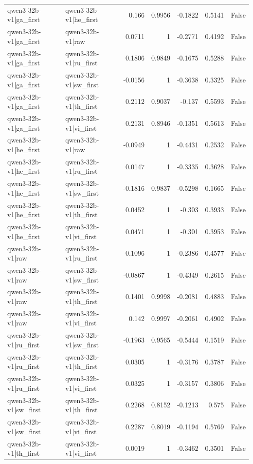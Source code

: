 \begin{table}
\begin{tabular}{l l r r r r l}
qwen3-32b-v1|ga_first & qwen3-32b-v1|he_first & 0.166 & 0.9956 & -0.1822 & 0.5141 & False \\
qwen3-32b-v1|ga_first & qwen3-32b-v1|raw & 0.0711 & 1 & -0.2771 & 0.4192 & False \\
qwen3-32b-v1|ga_first & qwen3-32b-v1|ru_first & 0.1806 & 0.9849 & -0.1675 & 0.5288 & False \\
qwen3-32b-v1|ga_first & qwen3-32b-v1|sw_first & -0.0156 & 1 & -0.3638 & 0.3325 & False \\
qwen3-32b-v1|ga_first & qwen3-32b-v1|th_first & 0.2112 & 0.9037 & -0.137 & 0.5593 & False \\
qwen3-32b-v1|ga_first & qwen3-32b-v1|vi_first & 0.2131 & 0.8946 & -0.1351 & 0.5613 & False \\
qwen3-32b-v1|he_first & qwen3-32b-v1|raw & -0.0949 & 1 & -0.4431 & 0.2532 & False \\
qwen3-32b-v1|he_first & qwen3-32b-v1|ru_first & 0.0147 & 1 & -0.3335 & 0.3628 & False \\
qwen3-32b-v1|he_first & qwen3-32b-v1|sw_first & -0.1816 & 0.9837 & -0.5298 & 0.1665 & False \\
qwen3-32b-v1|he_first & qwen3-32b-v1|th_first & 0.0452 & 1 & -0.303 & 0.3933 & False \\
qwen3-32b-v1|he_first & qwen3-32b-v1|vi_first & 0.0471 & 1 & -0.301 & 0.3953 & False \\
qwen3-32b-v1|raw & qwen3-32b-v1|ru_first & 0.1096 & 1 & -0.2386 & 0.4577 & False \\
qwen3-32b-v1|raw & qwen3-32b-v1|sw_first & -0.0867 & 1 & -0.4349 & 0.2615 & False \\
qwen3-32b-v1|raw & qwen3-32b-v1|th_first & 0.1401 & 0.9998 & -0.2081 & 0.4883 & False \\
qwen3-32b-v1|raw & qwen3-32b-v1|vi_first & 0.142 & 0.9997 & -0.2061 & 0.4902 & False \\
qwen3-32b-v1|ru_first & qwen3-32b-v1|sw_first & -0.1963 & 0.9565 & -0.5444 & 0.1519 & False \\
qwen3-32b-v1|ru_first & qwen3-32b-v1|th_first & 0.0305 & 1 & -0.3176 & 0.3787 & False \\
qwen3-32b-v1|ru_first & qwen3-32b-v1|vi_first & 0.0325 & 1 & -0.3157 & 0.3806 & False \\
qwen3-32b-v1|sw_first & qwen3-32b-v1|th_first & 0.2268 & 0.8152 & -0.1213 & 0.575 & False \\
qwen3-32b-v1|sw_first & qwen3-32b-v1|vi_first & 0.2287 & 0.8019 & -0.1194 & 0.5769 & False \\
qwen3-32b-v1|th_first & qwen3-32b-v1|vi_first & 0.0019 & 1 & -0.3462 & 0.3501 & False \\
\bottomrule
\end{tabular}
\end{table}
